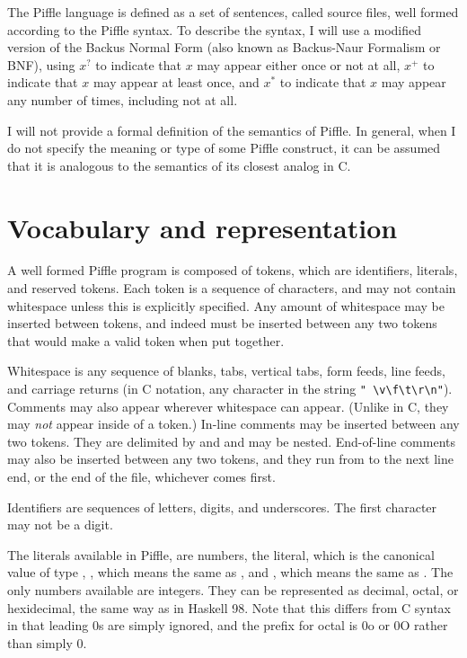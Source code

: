 \documentclass[a4paper,12pt]{scrreprt}
\begin{document}
The Piffle language is defined as a set of sentences, called source
files, well formed according to the Piffle syntax. To describe the
syntax, I will use a modified version of the Backus Normal Form (also
known as Backus-Naur Formalism or BNF), using $x^?$ to indicate that
$x$ may appear either once or not at all, $x^+$ to indicate that $x$
may appear at least once, and $x^*$ to indicate that $x$ may appear
any number of times, including not at all.

I will not provide a formal definition of the semantics of Piffle. In
general, when I do not specify the meaning or type of some Piffle
construct, it can be assumed that it is analogous to the semantics of
its closest analog in C.

\section{Vocabulary and representation}

A well formed Piffle program is composed of tokens, which are
identifiers, literals, and reserved tokens. Each token is a sequence
of characters, and may not contain whitespace unless this is
explicitly specified. Any amount of whitespace may be inserted between
tokens, and indeed must be inserted between any two tokens that would
make a valid token when put together.

Whitespace is any sequence of blanks, tabs, vertical tabs, form feeds,
line feeds, and carriage returns (in C notation, any character in the
string \verb." \v\f\t\r\n".). Comments may also appear wherever
whitespace can appear. (Unlike in C, they may \textit{not} appear
inside of a token.) In-line comments may be inserted between any
two tokens. They are delimited by \code{/*} and \code{*/} and may be
nested. End-of-line comments may also be inserted between any two
tokens, and they run from \code{//} to the next line end, or the end of
the file, whichever comes first.

Identifiers are sequences of letters, digits, and underscores. The
first character may not be a digit. 

The literals available in Piffle, are numbers, the 
literal, which is the canonical value of type ,
, which means the same as , and
, which means the same as . The only
numbers available are integers. They can be represented as decimal,
octal, or hexidecimal, the same way as in Haskell 98. Note that this
differs from C syntax in that leading 0s are simply ignored, and the
prefix for octal is 0o or 0O rather than simply 0.
\end{document}
